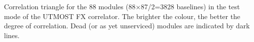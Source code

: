 Correlation triangle for the 88 modules (88$\times$87/2=3828 baselines) in the test mode of the UTMOST FX correlator. The brighter the colour, the better the degree of correlation. Dead (or as yet unserviced) modules are indicated by dark lines.
  